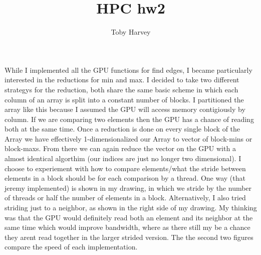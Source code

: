 \documentclass{article}
\begin{document}
\title{HPC hw2}
\author{Toby Harvey}
\maketitle

While I implemented all the GPU functions for find edges, I became particularly  interested in the reductions for min and max. I decided to take two different strategys for the reduction, both share the same basic scheme in which each column of an array is split into a constant number of blocks. I partitioned the array like this because I assumed the GPU will access memory contigiously by column. If we are comparing two elements then the GPU has a chance of reading both at the same time. Once a reduction is done on every single block of the Array we have effectively 1-dimensionalized our Array to vector of block-mins or block-maxs. From there we can again reduce the vector on the GPU with a almost identical algorthim (our indices are just no longer two dimensional). I choose to experiement with how to compare elements/what the stride between elements in a block should be for each comparison by a thread. One way (that jeremy implemented) is shown in my drawing, in which we stride by the number of threads or half the number of elements in a block. Alternatively, I also tried striding just to a neighbor, as shown in the right side of my drawing. My thinking was that the GPU would definitely read both an element and its neighbor at the same time which would improve bandwidth, where as there still my be a chance they arent read together in the larger strided version. The the second two figures compare the speed of each implementation.
\end{document}
